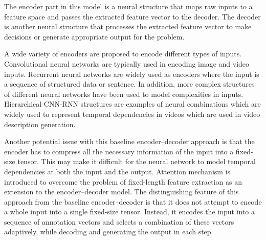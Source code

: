 \documentclass[preprint, 10pt]{elsarticle}
\begin{document}
	The encoder part in this model is a neural structure that maps raw inputs to a feature space and passes the extracted feature vector to the decoder. The decoder is another neural structure that processes the extracted feature vector to make decisions or generate appropriate output for the problem.
	
	A wide variety of encoders are proposed to encode different types of inputs. Convolutional neural networks are typically used in encoding image and video inputs. Recurrent neural networks are widely used as encoders where the input is a sequence of structured data or sentence. In addition, more complex structures of different neural networks have been used to model complexities in inputs. Hierarchical CNN-RNN structures are examples of neural combinations which are widely used to represent temporal dependencies in videos which are used in video description generation.
	
	
	Another potential issue with this baseline encoder–decoder approach is that the encoder has to compress all the necessary information of the input into a fixed-size tensor. This may make it difficult for the neural network to model temporal dependencies at both the input and the output. Attention mechanism is introduced to overcome the problem of fixed-length feature extraction as an extension to the encoder–decoder model. The distinguishing feature of this approach from the baseline encoder–decoder is that it does not attempt to encode a whole input into a single fixed-size tensor. Instead, it encodes the input into a sequence of annotation vectors and selects a combination of these vectors adaptively, while decoding and generating the output in each step.
	
\end{document}

